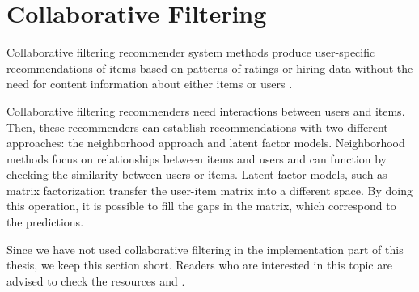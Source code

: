 
\section{Collaborative Filtering}\label{section:collaborative_filtering}

Collaborative filtering recommender system methods produce user-specific recommendations of items based on patterns of ratings or hiring data without the need for content information about either items or users \cite{desrosiers2011comprehensive}.

Collaborative filtering recommenders need interactions between users and items. Then, these recommenders can establish recommendations with two different approaches: the neighborhood approach and latent factor models. Neighborhood methods focus on relationships between items and users and can function by checking the similarity between users or items.  Latent factor models, such as matrix factorization transfer the user-item matrix into a different space. By doing this operation, it is possible to fill the gaps in the matrix, which correspond to the predictions.

Since we have not used collaborative filtering in the implementation part of this thesis, we keep this section short. Readers who are interested in this topic are advised to check the resources \cite{koren2015advances} and \cite{wang2015collaborative}.

